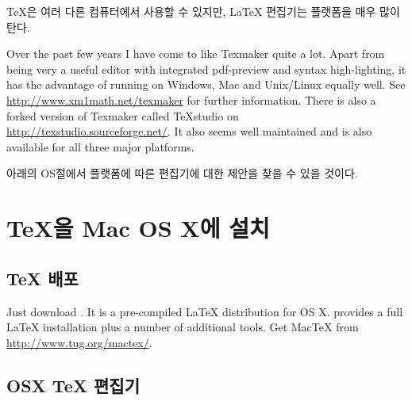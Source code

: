 \TeX{}은 여러 다른 컴퓨터에서 사용할 수 있지만, \LaTeX{} 편집기는 플랫폼을 매우 많이 탄다.

Over the past few years I have come to like Texmaker quite a lot.
Apart from being very a useful editor with integrated pdf-preview and syntax
high-lighting, it has the advantage of running on Windows, Mac and
Unix/Linux equally well.  See \url{http://www.xm1math.net/texmaker} for
further information.  There is also a forked version of Texmaker called
TeXstudio on \url{http://texstudio.sourceforge.net/}.  It also seems well
maintained and is also available for all three major platforms.

아래의 OS절에서 플랫폼에 따른 편집기에 대한 제안을 찾을 수 있을 것이다.

\section{\TeX{}을 Mac OS X에 설치}

\subsection{\TeX{} 배포}

Just download . It is a
pre-compiled \LaTeX{} distribution for OS X.  provides a full \LaTeX{}
installation plus a number of additional tools. Get Mac\TeX{} from
\url{http://www.tug.org/mactex/}.

\subsection{OSX \TeX{} 편집기}

